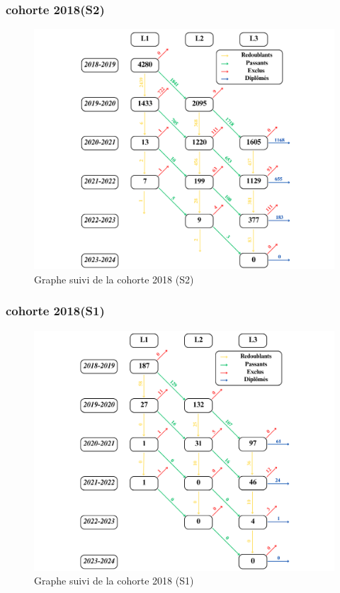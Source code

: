 \newpage
\subsubsection{cohorte 2018(S2)}

\begin{figure}[ht]
    \centering
    \caption{Graphe suivi de la cohorte 2018 (S2)}
    \includegraphics[width=1\textwidth]{figure/S2_2018.png}
\end{figure}

\newpage
\subsubsection{cohorte 2018(S1)}

\begin{figure}[ht]
    \centering
    \caption{Graphe suivi de la cohorte 2018 (S1)}
    \includegraphics[width=1\textwidth]{figure/S1_2018.png}
\end{figure}

